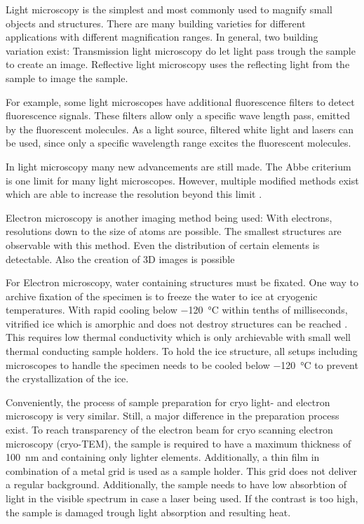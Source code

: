 

Light microscopy is the simplest and most commonly used to magnify small objects and structures. There are many building varieties for different applications with different magnification ranges. In general, two building variation exist: Transmission light microscopy do let light pass trough the sample to create an image. Reflective light microscopy uses the reflecting light from the sample to image the sample. 

For example, some light microscopes have additional fluorescence filters to detect fluorescence signals. These filters allow only a specific wave length pass, emitted by the fluorescent molecules. As a light source, filtered white light and lasers can be used, since only a specific wavelength range excites the fluorescent molecules.

In light microscopy many new advancements are still made. The Abbe criterium is one limit for many light microscopes. However, multiple modified methods exist which are able to increase the resolution beyond this limit \cite{Heintzmann.2006}.

Electron microscopy is another imaging method being used: With electrons, resolutions down to the size of atoms are possible. The smallest structures are observable with this method. Even the distribution of certain elements is detectable. Also the creation of 3D images is possible

For Electron microscopy, water containing structures must be fixated. One way to archive fixation of the specimen is to freeze the water to ice at cryogenic temperatures. With rapid cooling below \SI{-120}{\degreeCelsius} within tenths of milliseconds, vitrified ice which is amorphic and does not destroy structures can be reached  \cite{Wowk.2010}. This requires low thermal conductivity which is only archievable with small well thermal conducting sample holders. To hold the ice structure, all setups including microscopes to handle the specimen needs to be cooled below \SI{-120}{\degreeCelsius} to prevent the crystallization of the ice.

Conveniently, the process of sample preparation for cryo light- and electron microscopy is very similar. Still, a major difference in the preparation process exist. To reach transparency of the electron beam for cryo scanning electron microscopy (cryo-TEM), the sample is required to have a maximum thickness of \SI{100}{\nano\meter} and containing only lighter elements. Additionally, a thin film in combination of a metal grid is used as a sample holder. This grid does not deliver a regular background. Additionally, the sample needs to have low absorbtion of light in the visible spectrum in case a laser being used. If the contrast is too high, the sample is damaged trough light absorption and resulting heat.

